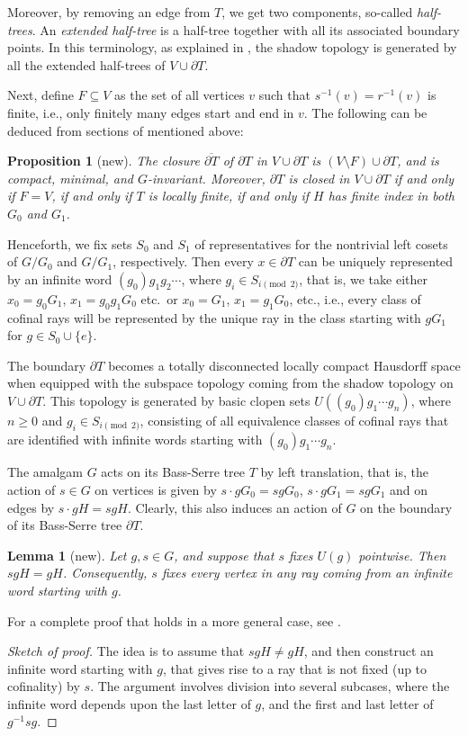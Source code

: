 \documentclass[a4paper]{amsart}
\theoremstyle{plain}
\newtheorem*{proposition*}{Proposition}
\newtheorem*{lemma*}{Lemma}
\theoremstyle{definition}
\theoremstyle{remark}
\numberwithin{theorem}{section}
\begin{document}
Moreover, by removing an edge from $T$, we get two components, so-called \emph{half-trees}.
An \emph{extended half-tree} is a half-tree together with all its associated boundary points.
In this terminology, as explained in \cite[Section~4.3]{Boudec-Bon}, the shadow topology is generated by all the extended half-trees of $V\cup\partial T$.

Next, define $F\subseteq V$ as the set of all vertices $v$ such that $s^{-1}(v)=r^{-1}(v)$ is finite, i.e., only finitely many edges start and end in $v$.
The following can be deduced from sections of \cite{Boudec-Bon,MS} mentioned above:
\begin{proposition*}[new]
The closure $\overline{\partial T}$ of $\partial T$ in $V\cup\partial T$ is $(V\setminus F)\cup\partial T$, and is compact, minimal, and $G$-invariant.
Moreover, $\partial T$ is closed in $V\cup\partial T$ if and only if $F=V$, if and only if $T$ is locally finite, if and only if $H$ has finite index in both $G_0$ and $G_1$.
\end{proposition*}

Henceforth, we fix sets $S_0$ and $S_1$ of representatives for the nontrivial left cosets of $G/G_0$ and $G/G_1$, respectively.
Then every $x\in \partial T$ can be uniquely represented by an infinite word $(g_0)g_1g_2\dotsm$,
where $g_i\in S_{i\pmod 2}$,
that is, we take either $x_0=g_0G_1$, $x_1=g_0g_1G_0$ etc.\ or $x_0=G_1$, $x_1=g_1G_0$, etc.,
i.e., every class of cofinal rays will be represented by the unique ray in the class starting with $gG_1$ for $g\in S_0\cup\{e\}$.

The boundary $\partial T$ becomes a totally disconnected locally compact Hausdorff space when equipped with the subspace topology coming from the shadow topology on $V\cup\partial T$.
This topology is generated by basic clopen sets $U((g_0)g_1\dotsm g_n)$, where $n\geq 0$ and $g_i\in S_{i\pmod 2}$,
consisting of all equivalence classes of cofinal rays that are identified with infinite words starting with $(g_0)g_1\dotsm g_n$.

The amalgam $G$ acts on its Bass-Serre tree $T$ by left translation, that is,
the action of $s\in G$ on vertices is given by $s\cdot gG_0=sgG_0$, $s\cdot gG_1=sgG_1$ and on edges by $s\cdot gH=sgH$.
Clearly, this also induces an action of $G$ on the boundary of its Bass-Serre tree $\partial T$.

\begin{lemma*}[new]
Let $g,s\in G$, and suppose that $s$ fixes $U(g)$ pointwise.
Then $sgH=gH$.
Consequently, $s$ fixes every vertex in any ray coming from an infinite word starting with $g$.
\end{lemma*}
For a complete proof that holds in a more general case, see \cite[Lemma~3.6]{BIO}.
\begin{proof}[Sketch of proof]
The idea is to assume that $sgH\neq gH$, and then construct an infinite word starting with $g$, that gives rise to a ray that is not fixed (up to cofinality) by $s$.
The argument involves division into several subcases, where the infinite word depends upon the last letter of $g$, and the first and last letter of $g^{-1}sg$.
\end{proof}
\end{document}
